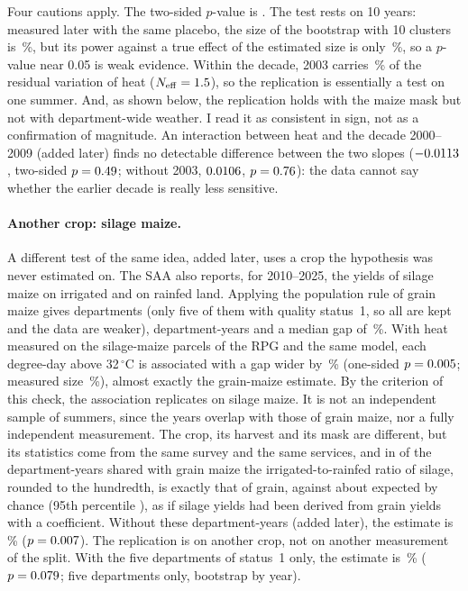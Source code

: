 Four cautions apply. The two-sided $p$-value is \QoneReplPtwo. The test rests on 10 years: measured later with the same placebo, the size of the bootstrap with 10 clusters is \ReplSize\,\%, but its power against a true effect of the estimated size is only \ReplPower\,\%, so a $p$-value near 0.05 is weak evidence. Within the decade, 2003 carries \LevThreeEarly\,\% of the residual variation of heat ($N_{\mathrm{eff}} = 1.5$), so the replication is essentially a test on one summer. And, as shown below, the replication holds with the maize mask but not with department-wide weather. I read it as consistent in sign, not as a confirmation of magnitude. An interaction between heat and the decade 2000--2009 (added later) finds no detectable difference between the two slopes ($-0.0113$, two-sided $p = 0.49$; without 2003, $0.0106$, $p = 0.76$): the data cannot say whether the earlier decade is really less sensitive.

\paragraph{Another crop: silage maize.} A different test of the same idea, added later, uses a crop the hypothesis was never estimated on. The SAA also reports, for 2010--2025, the yields of silage maize on irrigated and on rainfed land. Applying the population rule of grain maize gives \FodderDeps{} departments (only five of them with quality status~1, so all are kept and the data are weaker), \FodderN{} department-years and a median gap of \FodderGap\,\%. With heat measured on the silage-maize parcels of the RPG and the same model, each degree-day above 32\,$^{\circ}$C is associated with a gap wider by \FodderPct\,\% (one-sided $p = 0.005$; measured size \FodderSize\,\%), almost exactly the grain-maize estimate. By the criterion of this check, the association replicates on silage maize. It is not an independent sample of summers, since the years overlap with those of grain maize, nor a fully independent measurement. The crop, its harvest and its mask are different, but its statistics come from the same survey and the same services, and in \FodderSameN{} of the \FodderPairsN{} department-years shared with grain maize the irrigated-to-rainfed ratio of silage, rounded to the hundredth, is exactly that of grain, against about \FodderSameRef{} expected by chance (95th percentile \FodderSameRefP), as if silage yields had been derived from grain yields with a coefficient. Without these department-years (added later), the estimate is \FodderNoSamePct\,\% ($p = 0.007$). The replication is on another crop, not on another measurement of the split. With the five departments of status~1 only, the estimate is \FodderSOnePct\,\% ($p = 0.079$; five departments only, bootstrap by year).

